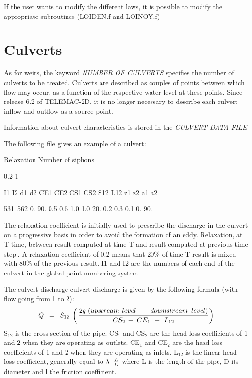  If the user wants to modify the different laws, it is possible to modify the appropriate subroutines (LOIDEN.f and LOINOY.f)


\section{ Culverts}

 As for weirs, the keyword \textit{NUMBER OF CULVERTS} specifies the number of culverts to be treated. Culverts are described as couples of points between which flow may occur, as a function of the respective water level at these points. Since release 6.2 of TELEMAC-2D, it is no longer necessary to describe each culvert inflow and outflow as a source point.

 Information about culvert characteristics is stored in the \textit{CULVERT DATA FILE}

 The following file gives an example of a culvert:

 Relaxation   Number of siphons

   0.2              1

 I1   I2  d1  d2   CE1  CE2  CS1   CS2   S12  L12  z1   z2  a1   a2

 531~562  0.  90.  0.5  0.5  1.0   1.0   20.  0.2  0.3  0.1  0.  90.

 The relaxation coefficient is initially used to prescribe the discharge in the culvert on a progressive basis in order to avoid the formation of an eddy. Relaxation, at T time, between result computed at time T and result computed at previous time step.. A relaxation coefficient of 0.2 means that 20\% of time T result is mixed with 80\% of the previous result. I1 and I2 are the numbers of each end of the culvert in the global point numbering system.

 The culvert discharge culvert discharge is given by the following formula (with flow going from 1 to 2):
\[Q{\kern 1pt} {\kern 1pt} {\kern 1pt} {\kern 1pt} {\kern 1pt} ={\kern 1pt} {\kern 1pt} {\kern 1pt} {\kern 1pt} {\kern 1pt} S_{12} {\kern 1pt} {\kern 1pt} {\kern 1pt} \left({\kern 1pt} \frac{2g{\kern 1pt} {\kern 1pt} {\kern 1pt} (upstream{\kern 1pt} {\kern 1pt} {\kern 1pt} {\kern 1pt} level{\kern 1pt} {\kern 1pt} {\kern 1pt} {\kern 1pt} {\kern 1pt} -{\kern 1pt} {\kern 1pt} {\kern 1pt} {\kern 1pt} downstream{\kern 1pt} {\kern 1pt} {\kern 1pt} {\kern 1pt} {\kern 1pt} level)}{CS_{2} {\kern 1pt} {\kern 1pt} +{\kern 1pt} {\kern 1pt} {\kern 1pt} CE_{1} {\kern 1pt} {\kern 1pt} {\kern 1pt} {\kern 1pt} +{\kern 1pt} {\kern 1pt} {\kern 1pt} {\kern 1pt} L_{12} } \right)\]
S${}_{12}$ is the cross-section of the pipe. CS${}_{1}$ and CS${}_{2}$ are the head loss coefficients of 1 and 2 when they are operating as outlets. CE${}_{1}$ and CE${}_{2}$ are the head loss coefficients of 1 and 2 when they are operating as inlets. L${}_{12}$ is the linear head loss coefficient, generally equal to $\lambda {\kern 1pt} {\kern 1pt} {\kern 1pt} {\kern 1pt} {\kern 1pt} \frac{L}{D} $ where L is the length of the pipe, D its diameter and l the friction coefficient.

